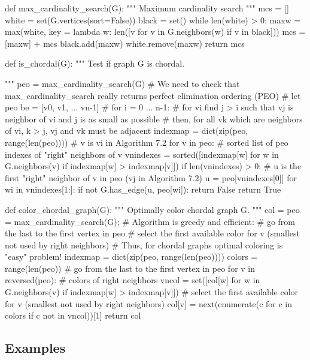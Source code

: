 \begin{sageCell}
def max_cardinality_search(G):
    """
    Maximum cardinality search
    """
    mcs = []
    white = set(G.vertices(sort=False))
    black = set()
    while len(white) > 0:
        maxw = max(white, key = lambda w: len([v for v in G.neighbors(w) if v in black]))
        mcs = [maxw] + mcs
        black.add(maxw)
        white.remove(maxw)
    return mcs

def is_chordal(G):
    """
    Test if graph G is chordal.

    """
    peo = max_cardinality_search(G)
    # We need to check that max_cardinality_search really returns perfect elimination ordering (PEO)
    # let peo be = [v0, v1, ... v{n-1}]
    # for i = 0 ... n-1:
    #    for vi find j > i such that vj is neighbor of vi and j is as small as possible
    #    then, for all vk which are neighbors of vi, k > j, vj and vk must be adjacent
    indexmap = dict(zip(peo, range(len(peo))))
    # v is vi in Algorithm 7.2
    for v in peo:
        # sorted list of peo indexes of "right" neighbors of v
        vnindexes = sorted([indexmap[w] for w in G.neighbors(v) if indexmap[w] > indexmap[v]])
        if len(vnindexes) > 0:
            # u is the first "right" neighbor of v in peo (vj in Algorithm 7.2)
            u = peo[vnindexes[0]]
            for wi in vnindexes[1:]:
                if not G.has_edge(u, peo[wi]):
                    return False
    return True

def color_chordal_graph(G):
    """
    Optimally color chordal graph G.
    """
    col = {}
    peo = max_cardinality_search(G);
    # Algorithm is greedy and efficient:
    #   go from the last to the first vertex in peo
    #   select the first available color for v (smallest not used by right neighbors)
    # Thus, for chordal graphs optimal coloring is "easy" problem!
    indexmap = dict(zip(peo, range(len(peo))))
    colors = range(len(peo))
    # go from the last to the first vertex in peo
    for v in reversed(peo):
        # colors of right neighbors
        vncol = set([col[w] for w in G.neighbors(v) if indexmap[w] > indexmap[v]])
        # select the first available color for v (smallest not used by right neighbors)
        col[v] = next(enumerate(c for c in colors if c not in vncol))[1]
    return col
\end{sageCell}

\subsection*{Examples}

